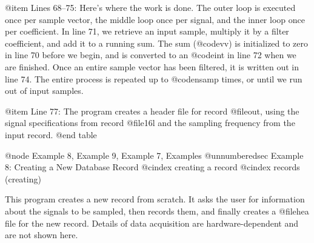 {{{{{{{{{{@item Lines 68--75:
Here's where the work is done.  The outer loop is executed once per
sample vector, the middle loop once per signal, and the inner loop
once per coefficient.  In line 71, we retrieve an input sample,
multiply it by a filter coefficient, and add it to a running sum.
The sum (@code{vv}) is initialized to zero in line 70 before we begin, and is
converted to an @code{int} in line 72 when we are finished.  Once
an entire sample vector has been filtered, it is written out in line 74.
The entire process is repeated up to @code{nsamp} times, or until
we run out of input samples.

@item Line 77:
The program creates a header file for record @file{out}, using
the signal specifications from record @file{16l} and the sampling
frequency from the input record.
@end table

@node     Example 8, Example 9, Example 7, Examples
@unnumberedsec Example 8:  Creating a New Database Record
@cindex creating a record
@cindex records (creating)

This program creates a new record from scratch.  It asks the user for
information about the signals to be sampled, then records them, and
finally creates a @file{hea} file for the new record.  Details of
data acquisition are hardware-dependent and are not shown here. 

}}}}}}}}}}

